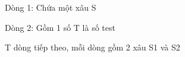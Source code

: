 Dòng 1: Chứa một xâu S  

   Dòng 2: Gồm 1 số T là số test  

   T dòng tiếp theo, mỗi dòng gồm 2 xâu S1 và S2